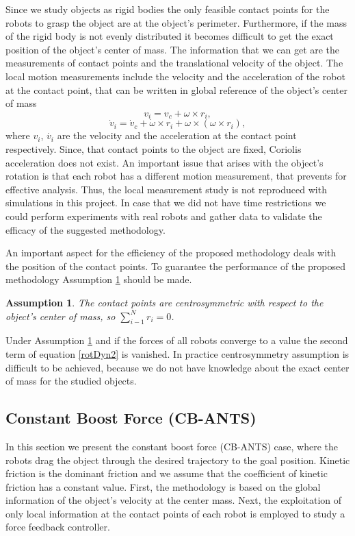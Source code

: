 \documentclass[letterpaper, 10 pt, conference]{ieeeconf}
\newtheorem{assumption}{\textbf{Assumption}}
\begin{document}
Since we study objects as rigid bodies the only feasible contact points for the robots to grasp the object are at the object's perimeter. Furthermore, if the mass of the rigid body is not evenly distributed it becomes difficult to get the exact position of the object's center of mass. The information that we can get are the measurements of contact points and the translational velocity of the object. The local motion measurements include the velocity and the acceleration of the robot at the contact point, that can be written in global reference of the object's center of mass 
\begin{equation}
v_i=v_c +\omega \times r_i,
\end{equation}
\begin{equation}
\dot{v}_i=\dot{v}_c +\dot{\omega }\times r_i+\omega \times (\omega \times r_i),
\end{equation}
where $v_i$, $\dot{v_i}$ are the velocity and the acceleration at the contact point respectively. Since, that contact points to the object are fixed, Coriolis acceleration does not exist. An important issue that arises with the object's rotation is that each robot has a different motion measurement, that prevents for effective analysis. Thus, the local measurement study is not reproduced with simulations in this project. In case that we did not have time restrictions we could perform experiments with real robots and gather data to validate the efficacy of the suggested methodology.

An important aspect for the efficiency of the proposed methodology deals with the position of the contact points. To guarantee the performance of the proposed methodology Assumption \ref{as3} should be made.\vspace{.2cm}
\begin{assumption}\label{as3}
\textit{The contact points are centrosymmetric with respect to the object's center of mass, so $\sum_{i-1}^{N}r_i=0$.} \vspace{.2cm}
\end{assumption}
Under Assumption \ref{as3} and if the forces of all robots converge to a value the second term of equation \ref{rotDyn2} is vanished. In practice centrosymmetry assumption is difficult to be achieved, because we do not have knowledge about the exact center of mass for the studied objects.

\subsection{Constant Boost Force (CB-ANTS)}\label{cb}
In this section we present the constant boost force (CB-ANTS) case, where the robots drag the object through the desired trajectory to the goal position. Kinetic friction is the dominant friction and we assume that the coefficient of kinetic friction has a constant value. First, the methodology is based on the global information of the object's velocity at the center mass. Next, the exploitation of only local information at the contact points of each robot is employed to study a force feedback controller.
\end{document}
